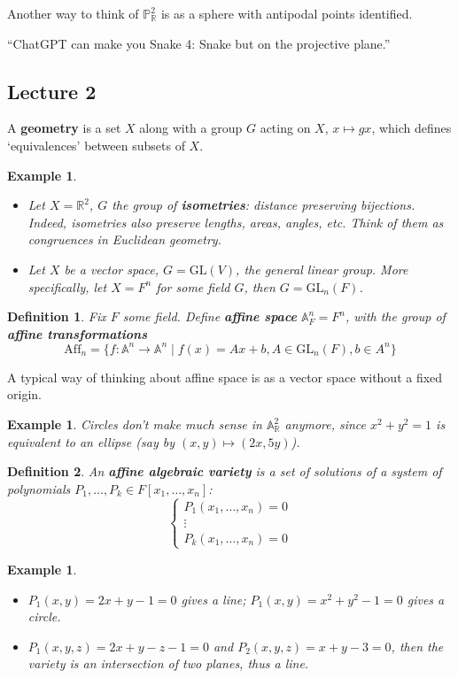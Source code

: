 \documentclass[12pt]{article}
\newcommand{\R}{\mathbb{R}}
\renewcommand{\P}{\mathbb{P}}
\newcommand{\GL}{\mathrm{GL}}
\newcommand{\A}{\mathbb{A}}
\newtheorem{definition}{Definition}
\newtheorem{example}[]{Example}
\begin{document}
        Another way to think of $\P_\R^2$ is as a sphere with antipodal points identified. \par
        ``ChatGPT can make you Snake 4: Snake but on the projective plane.''
        
    \subsection{Lecture 2} 
    A \textbf{geometry} is a set $X$ along with a group $G$ acting on $X$, $x \mapsto gx$, which defines `equivalences' between subsets of $X$. 
    \begin{example}
        \begin{itemize}
            \item Let $X = \R^2$, $G$ the group of \textbf{isometries}: distance preserving bijections. Indeed, isometries also preserve lengths, areas, angles, etc. Think of them as congruences in Euclidean geometry. 
            \item Let $X$ be a vector space, $G = \text{GL}(V)$, the general linear group. More specifically, let $X = F^n$ for some field $G$, then $G = \GL_n(F)$.  
        \end{itemize}
    \end{example}
    \begin{definition}
        Fix $F$ some field. Define \textbf{affine space} $\A_F^n = F^n$, with the group of \textbf{affine transformations} $$\mathrm{Aff}_n = \{f: \A^n \to \A^n \mid f(x) = Ax + b, A \in \GL_n(F), b \in A^n\}$$
    \end{definition}
    A typical way of thinking about affine space is as a vector space without a fixed origin. 
    \begin{example}
        Circles don't make much sense in $\A_\R^2$ anymore, since $x^2 + y^2 = 1$ is equivalent to an ellipse (say by $(x, y) \mapsto (2x, 5y)$). 
    \end{example}
    \begin{definition}
        An \textbf{affine algebraic variety} is a set of solutions of a system of polynomials $P_1, \dots, P_k \in F[x_1, \dots, x_n]$:
        $$\begin{cases}
            P_1(x_1, \dots, x_n) = 0 \\
            \vdots \\
            P_k(x_1, \dots, x_n) = 0
        \end{cases}$$
    \end{definition}
    \begin{example}
        \begin{itemize}
            \item $P_1(x, y) = 2x + y - 1 = 0$ gives a line; $P_1(x, y) = x^2 + y^2 - 1 = 0$ gives a circle.
            \item $P_1(x, y, z) = 2x+y-z-1 = 0$ and $P_2(x, y, z) = x + y -3 = 0$, then the variety is an intersection of two planes, thus a line.  
        \end{itemize}
    \end{example}
\end{document}

